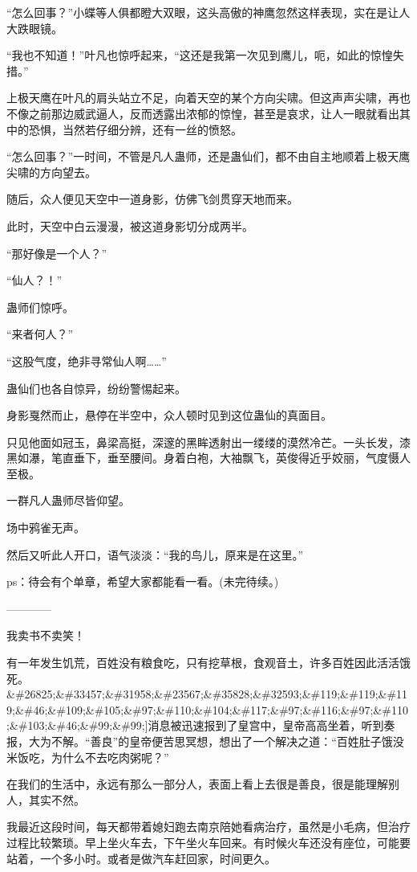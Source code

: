 \begin{this_body}
“怎么回事？”小蝶等人俱都瞪大双眼，这头高傲的神鹰忽然这样表现，实在是让人大跌眼镜。

“我也不知道！”叶凡也惊呼起来，“这还是我第一次见到鹰儿，呃，如此的惊惶失措。”

上极天鹰在叶凡的肩头站立不足，向着天空的某个方向尖啸。但这声声尖啸，再也不像之前那边威武逼人，反而透露出浓郁的惊惶，甚至是哀求，让人一眼就看出其中的恐惧，当然若仔细分辨，还有一丝的愤怒。

“怎么回事？”一时间，不管是凡人蛊师，还是蛊仙们，都不由自主地顺着上极天鹰尖啸的方向望去。

随后，众人便见天空中一道身影，仿佛飞剑贯穿天地而来。

此时，天空中白云漫漫，被这道身影切分成两半。

“那好像是一个人？”

“仙人？！”

蛊师们惊呼。

“来者何人？”

“这股气度，绝非寻常仙人啊……”

蛊仙们也各自惊异，纷纷警惕起来。

身影戛然而止，悬停在半空中，众人顿时见到这位蛊仙的真面目。

只见他面如冠玉，鼻梁高挺，深邃的黑眸透射出一缕缕的漠然冷芒。一头长发，漆黑如瀑，笔直垂下，垂至腰间。身着白袍，大袖飘飞，英俊得近乎姣丽，气度慑人至极。

一群凡人蛊师尽皆仰望。

场中鸦雀无声。

然后又听此人开口，语气淡淡：“我的鸟儿，原来是在这里。”

ps：待会有个单章，希望大家都能看一看。(未完待续。)

------------

我卖书不卖笑！

有一年发生饥荒，百姓没有粮食吃，只有挖草根，食观音土，许多百姓因此活活饿死。\&\#26825;\&\#33457;\&\#31958;\&\#23567;\&\#35828;\&\#32593;\&\#119;\&\#119;\&\#119;\&\#46;\&\#109;\&\#105;\&\#97;\&\#110;\&\#104;\&\#117;\&\#97;\&\#116;\&\#97;\&\#110;\&\#103;\&\#46;\&\#99;\&\#99;]消息被迅速报到了皇宫中，皇帝高高坐着，听到奏报，大为不解。“善良”的皇帝便苦思冥想，想出了一个解决之道：“百姓肚子饿没米饭吃，为什么不去吃肉粥呢？”

在我们的生活中，永远有那么一部分人，表面上看上去很是善良，很是能理解别人，其实不然。

我最近这段时间，每天都带着媳妇跑去南京陪她看病治疗，虽然是小毛病，但治疗过程比较繁琐。早上坐火车去，下午坐火车回来。有时候火车还没有座位，可能要站着，一个多小时。或者是做汽车赶回家，时间更久。


\end{this_body}
